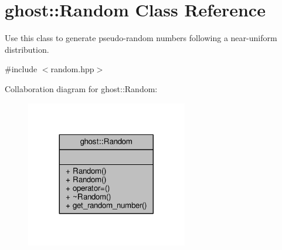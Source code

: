 \hypertarget{classghost_1_1Random}{}\section{ghost\+:\+:Random Class Reference}
\label{classghost_1_1Random}


Use this class to generate pseudo-\/random numbers following a near-\/uniform distribution.  




{\ttfamily \#include $<$random.\+hpp$>$}



Collaboration diagram for ghost\+:\+:Random\+:\nopagebreak
\begin{figure}[H]
\begin{center}
\leavevmode
\includegraphics[width=200pt]{classghost_1_1Random__coll__graph}
\end{center}
\end{figure}
